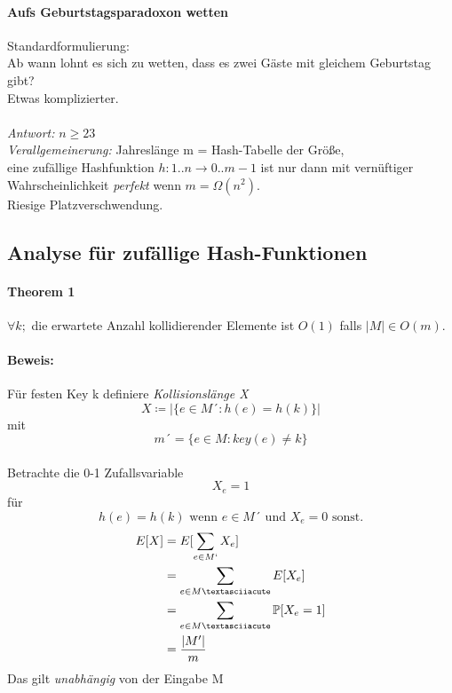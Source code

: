 \documentclass[a4paper]{scrartcl}
\begin{document}
	\paragraph{Aufs Geburtstagsparadoxon wetten}
	Standardformulierung:\\
	Ab wann lohnt es sich zu wetten, dass es zwei Gäste mit gleichem Geburtstag gibt?\\
	Etwas komplizierter.\\
	\\
	\emph{Antwort:} \( n \geq 23 \)\\
	\emph{Verallgemeinerung:} Jahreslänge m = Hash-Tabelle der Größe,\\
	eine zufällige Hashfunktion \( h: 1..n \rightarrow 0..m -1 \) ist nur dann mit vernüftiger Wahrscheinlichkeit \emph{perfekt} wenn \( m = \Omega (n^2) \).\\
	Riesige Platzverschwendung.\\
	 
	\subsection{Analyse für zufällige Hash-Funktionen}
	\paragraph{Theorem 1}
	\( \forall k ; \) die erwartete Anzahl kollidierender Elemente ist \(O (1) \) falls \( |M| \in O(m) \).\\
	
	\paragraph{Beweis:}
	Für festen Key k definiere \emph{Kollisionslänge X}\\
	\[X \coloneqq |\{ e \in M´: h(e) = h(k) \}| \] mit \[ m´= \{ e \in M : key(e) \neq k \} \]\\
	Betrachte die 0-1 Zufallsvariable \[ X_e = 1 \] für \[ h(e) = h(k) \text{ wenn } e \in M´\text{ und } X_e = 0 \text{ sonst.} \] 
	\begin{align*}
		E[X] &= E[ \sum_{e \in M`} X_e ]\\
		&= \sum_{e \in M´ } E[X_e] \\
		&= \sum_{e \in M´} \mathbb{P} [X_e = 1] \\
		&= \frac{|M'|}{m}
	\end{align*}
	Das gilt \emph{unabhängig} von der Eingabe M\\
	
\end{document}
